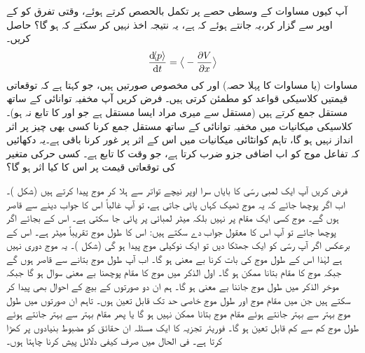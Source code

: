 آپ کیوں مساوات  کے وسطی حصے  پر تکمل بالحصص کرتے ہوئے، وقتی تفرق کو  کے اوپر سے گزار کر،یہ جانتے ہوئے کہ  ہے، یہ نتیجہ  اخذ  نہیں کر سکتے کہ  ہو گا؟
  حاصل کریں۔
\begin{align}\label{مساوات_تفاعل_موج_مخفی_توانائی_سے_معیار_حرکت}
\frac{\dif\langle p \rangle}{\dif t}=\big\langle-\frac{\partial V}{\partial x} \big\rangle
\end{align}
مساوات  (یا مساوات  کا پہلا حصہ) اور   کی مخصوص صورتیں ہیں، جو کہتا ہے کہ توقعاتی قیمتیں کلاسیکی قواعد کو مطمئن کرتی ہیں۔
فرض کریں آپ مخفیہ توانائی کے ساتھ   مستقل    جمع کرتے ہیں (مستقل سے میری مراد ایسا مستقل ہے جو  اور  کا تابع نہ ہو)۔ کلاسیکی میکانیات میں مخفیہ توانائی کے ساتھ مستقل جمع کرنا کسی بھی چیز پر اثر انداز نہیں ہو گا، تاہم کوانٹائی میکانیات میں اس کے اثر پر غور کرنا باقی ہے۔یہ دکھائیں کہ تفاعل موج کو اب اضافی جزو   ضرب کرتا ہے، جو وقت کا تابع  ہے۔ کسی حرکی متغیر کی توقعاتی قیمت پر  اس کا کیا اثر ہو گا؟ 

فرض کریں آپ ایک لمبی رسّی کا بایاں سرا اوپر نیچے تواتر سے  ہلا کر موج پیدا کرتے ہیں (شکل )۔ اب اگر پوچھا جائے کہ یہ موج ٹھیک  کہاں پائی جاتی ہے، تو آپ غالباً اس کا جواب دینے سے قاصر ہوں گے۔ موج کسی ایک مقام پر  نہیں بلکہ   میٹر لمبائی پر پائی جا سکتی ہے۔ اس کے بجائے اگر  پوچھا جائے تو آپ اس کا معقول جواب دے سکتے ہیں: اس کا طول موج تقریباً  میٹر ہے۔ اس کے برعکس اگر آپ رسّی کو ایک جھٹکا دیں تو ایک نوکیلی موج پیدا ہو گی  (شکل )۔ یہ موج دوری نہیں ہے لہٰذا اس کے طول موج کی بات کرنا بے معنی ہو گا۔ اب آپ طول موج بتانے سے قاصر ہوں گے جبکہ موج کا مقام بتانا ممکن ہو گا۔ اول الذکر میں موج کا مقام پوچھنا بے معنی سوال ہو گا جبکہ موخر الذکر میں طول موج جاننا بے معنی ہو گا۔ ہم ان دو صورتوں کے بیچ کے احوال  بھی پیدا کر سکتے ہیں جن میں مقام موج اور طول موج خاصی حد تک قابل تعین ہوں۔ تاہم ان صورتوں میں طول موج بہتر سے بہتر جانتے ہوئے مقام موج  بتانا ممکن  نہیں ہو گا یا پھر مقام بہتر سے بہتر جانتے ہوئے طول موج کم سے کم  قابل تعین   ہو گا۔ فوریئر تجزیہ کا ایک مسئلہ ان حقائق کو مضبوط بنیادوں پر کھڑا کرتا ہے۔ فی الحال میں صرف کیفی دلائل پیش کرنا چاہتا ہوں۔

